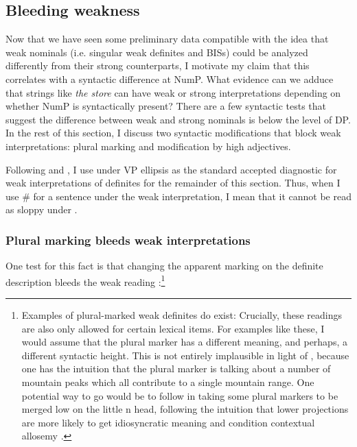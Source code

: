 \documentclass[output=paper,
modfonts
]{langscibook}
\begin{document}
\subsection{Bleeding weakness}

Now that we have seen some preliminary data compatible with the idea that weak nominals (i.e. singular weak definites and BISs) could be analyzed differently from their strong counterparts, I motivate my claim that this correlates with a syntactic difference  at NumP. What evidence can we adduce that strings like \textit{the store} can have weak or strong interpretations depending on whether NumP is syntactically present? There are a few syntactic tests that suggest the difference between weak and strong nominals is below the level of DP. In the rest of this section, I discuss two syntactic modifications that block weak interpretations: plural marking and modification by high adjectives.

Following \citet{CarlsonSussman2005} and \citet{Aguilar-Guevara2014}, I use  under VP ellipsis as the standard accepted diagnostic for weak interpretations of definites for the remainder of this section. Thus, when I use \# for a sentence under the weak interpretation, I mean that it cannot be read as sloppy under .

\subsubsection{Plural marking bleeds weak interpretations}

One test for this fact is that changing the apparent  marking on the definite description bleeds the weak reading \citep[19]{Aguilar-Guevara2014}:\footnote{Examples of plural-marked weak definites do exist:
\z 
{}
 \z
Crucially, these readings are also only allowed for certain lexical items. For examples like these, I would assume that the plural marker has a different meaning, and perhaps, a different syntactic height. This is not entirely implausible in light of , because one has the intuition that the plural marker is talking about a number of mountain peaks which all contribute to a single mountain range. One potential way to go would be to follow \citet{Kramer2015} in taking some plural markers to be merged low on the little n head, following the intuition that lower projections are more likely to get idiosyncratic meaning and condition contextual allosemy \citep{romanova2005,svenonius2005,marantz2013}.}
\end{document}
